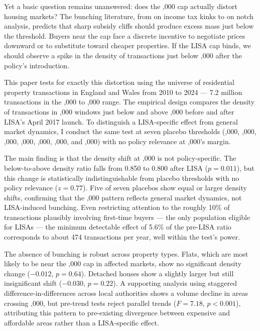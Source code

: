 \documentclass[12pt]{article}
\begin{document}
Yet a basic question remains unanswered: does the ,000 cap actually distort housing markets? The bunching literature, from \citet{saez2010} on income tax kinks to \citet{kleven2016} on notch analysis, predicts that sharp subsidy cliffs should produce excess mass just below the threshold. Buyers near the cap face a discrete incentive to negotiate prices downward or to substitute toward cheaper properties. If the LISA cap binds, we should observe a spike in the density of transactions just below ,000 after the policy's introduction.

This paper tests for exactly this distortion using the universe of residential property transactions in England and Wales from 2010 to 2024 --- 7.2 million transactions in the ,000 to ,000 range. The empirical design compares the density of transactions in ,000 windows just below and above ,000 before and after LISA's April 2017 launch. To distinguish a LISA-specific effect from general market dynamics, I conduct the same test at seven placebo thresholds (,000, ,000, ,000, ,000, ,000, ,000, and ,000) with no policy relevance at ,000's margin.

The main finding is that the density shift at ,000 is not policy-specific. The below-to-above density ratio falls from 0.850 to 0.800 after LISA ($p = 0.011$), but this change is statistically indistinguishable from placebo thresholds with no policy relevance ($z = 0.77$). Five of seven placebos show equal or larger density shifts, confirming that the ,000 pattern reflects general market dynamics, not LISA-induced bunching. Even restricting attention to the roughly 10\% of transactions plausibly involving first-time buyers --- the only population eligible for LISAs --- the minimum detectable effect of 5.6\% of the pre-LISA ratio corresponds to about 474 transactions per year, well within the test's power.

The absence of bunching is robust across property types. Flats, which are most likely to be near the ,000 cap in affected markets, show no significant density change ($-0.012$, $p = 0.64$). Detached houses show a slightly larger but still insignificant shift ($-0.030$, $p = 0.22$). A supporting analysis using staggered difference-in-differences across local authorities shows a volume decline in areas crossing ,000, but pre-trend tests reject parallel trends ($F = 7.18$, $p < 0.001$), attributing this pattern to pre-existing divergence between expensive and affordable areas rather than a LISA-specific effect.
\end{document}
